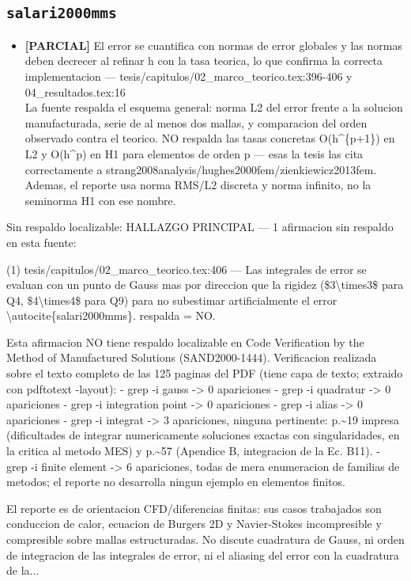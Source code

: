\documentclass[11pt,a4paper]{article}
\newcommand{\campo}[1]{\textcolor{gris}{\footnotesize #1}}
\begin{document}
\subsection{\texttt{salari2000mms}}
\begin{itemize}\small
\item \textbf{[PARCIAL]} El error se cuantifica con normas de error globales y las normas deben decrecer al refinar h con la tasa teorica, lo que confirma la correcta implementacion --- tesis/capitulos/02\_marco\_teorico.tex:396-406 y 04\_resultados.tex:16
\\ \campo{La fuente respalda el esquema general: norma L2 del error frente a la solucion manufacturada, serie de al menos dos mallas, y comparacion del orden observado contra el teorico. NO respalda las tasas concretas O(h\textasciicircum{}\{p+1\}) en L2 y O(h\textasciicircum{}p) en H1 para elementos de orden p --- esas la tesis las cita correctamente a strang2008analysis/hughes2000fem/zienkiewicz2013fem. Ademas, el reporte usa norma RMS/L2 discreta y norma infinito, no la seminorma H1 con ese nombre.}
\end{itemize}
{\small\campo{Sin respaldo localizable:} HALLAZGO PRINCIPAL --- 1 afirmacion sin respaldo en esta fuente:

(1) tesis/capitulos/02\_marco\_teorico.tex:406 --- \textquotedbl{}Las integrales de error se evaluan con un punto de Gauss mas por direccion que la rigidez (\$3\textbackslash{}times3\$ para Q4, \$4\textbackslash{}times4\$ para Q9) para no subestimar artificialmente el error \textbackslash{}autocite\{salari2000mms\}.\textquotedbl{}  respalda = NO.

Esta afirmacion NO tiene respaldo localizable en \textquotedbl{}Code Verification by the Method of Manufactured Solutions\textquotedbl{} (SAND2000-1444). Verificacion realizada sobre el texto completo de las 125 paginas del PDF (tiene capa de texto; extraido con pdftotext -layout):
  - grep -i \textquotedbl{}gauss\textquotedbl{}          -\textgreater{} 0 apariciones
  - grep -i \textquotedbl{}quadratur\textquotedbl{}      -\textgreater{} 0 apariciones
  - grep -i \textquotedbl{}integration point\textquotedbl{} -\textgreater{} 0 apariciones
  - grep -i \textquotedbl{}alias\textquotedbl{}          -\textgreater{} 0 apariciones
  - grep -i \textquotedbl{}integrat\textquotedbl{}       -\textgreater{} 3 apariciones, ninguna pertinente: p.\textasciitilde{}19 impresa (dificultades de integrar numericamente soluciones exactas con singularidades, en la critica al metodo MES) y p.\textasciitilde{}57 (Apendice B, integracion de la Ec. B11).
  - grep -i \textquotedbl{}finite element\textquotedbl{} -\textgreater{} 6 apariciones, todas de mera enumeracion de familias de metodos; el reporte no desarrolla ningun ejemplo en elementos finitos.

El reporte es de orientacion CFD/diferencias finitas: sus casos trabajados son conduccion de calor, ecuacion de Burgers 2D y Navier-Stokes incompresible y compresible sobre mallas estructuradas. No discute cuadratura de Gauss, ni orden de integracion de las integrales de error, ni el aliasing del error con la cuadratura de la...\par}
\end{document}
